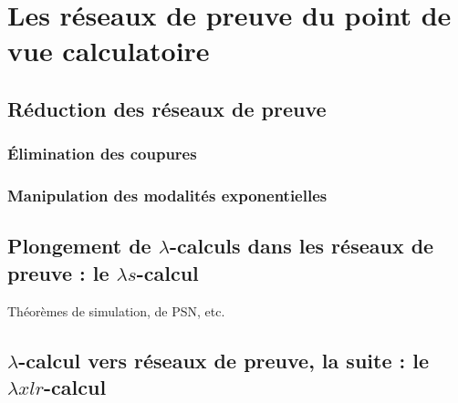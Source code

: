 \documentclass[a4paper, 11pt]{article}
\begin{document}
\section{Les réseaux de preuve du point de vue calculatoire}

\subsection{Réduction des réseaux de preuve}

\subsubsection{\'Elimination des coupures}

\subsubsection{Manipulation des modalités exponentielles}

\subsection{Plongement de $\lambda$-calculs dans les réseaux de preuve : le $\lambda s$-calcul}

Théorèmes de simulation, de PSN, etc. 

\subsection{$\lambda$-calcul vers réseaux de preuve, la suite : le $\lambda x l r$-calcul}
\end{document}

